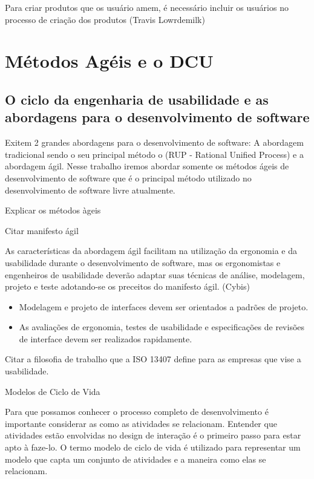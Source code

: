 
Para criar produtos que os usuário amem, é necessário incluir os usuários no processo de criação dos produtos (Travis Lowrdemilk)

\section{Métodos Agéis e o DCU}

\subsection{O ciclo da engenharia de usabilidade e as abordagens para o desenvolvimento de software}

	Exitem 2 grandes abordagens para o desenvolvimento de software: A abordagem tradicional sendo o seu principal método o (RUP - Rational Unified Process) e a abordagem ágil.
	Nesse trabalho iremos abordar somente os métodos ágeis de desenvolvimento de software que é o principal método utilizado no desenvolvimento de software livre atualmente.

Explicar os métodos àgeis

Citar manifesto ágil

As características da abordagem ágil facilitam na utilização da ergonomia e da usabilidade durante o desenvolvimento de software, mas os ergonomistas e engenheiros de usabilidade deverão adaptar suas técnicas de análise, modelagem, projeto e teste adotando-se os preceitos do manifesto ágil. (Cybis)

\begin{itemize}
\item Modelagem e projeto de interfaces devem ser orientados a padrões de projeto.
\item As avaliações de ergonomia, testes de usabilidade e especificações de revisões de interface devem ser realizados rapidamente.
\end{itemize}

Citar a filosofia de trabalho que a  ISO 13407 define para as empresas que vise a usabilidade.

Modelos de Ciclo de Vida

	Para que possamos conhecer o processo completo de desenvolvimento é importante considerar as como as atividades se relacionam. Entender que atividades estão envolvidas no design de interação é o primeiro passo para estar apto à faze-lo.
	O termo modelo de ciclo de vida é utilizado para representar um modelo que capta um conjunto de atividades e a maneira como elas se relacionam. ~\cite{preece2005interacao}

